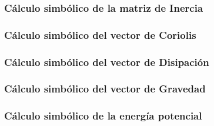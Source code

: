 \subsubsection{Cálculo simbólico de la matriz de Inercia} \label{cd:inercia}
    

\subsubsection{Cálculo simbólico del vector de Coriolis} \label{cd:coriolis}
    

\subsubsection{Cálculo simbólico del vector de Disipación} \label{cd:disipacion}
    

\subsubsection{Cálculo simbólico del vector de Gravedad} \label{cd:gravedad}
    

\subsubsection{Cálculo simbólico de la energía potencial} \label{cd:energia_potencial}
    